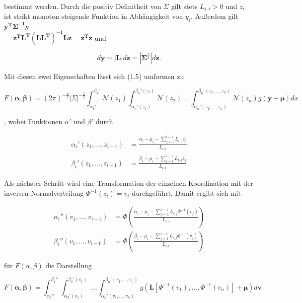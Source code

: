 \documentclass[12pt,a4paper]{scrartcl}
\numberwithin{equation}{section}
\begin{document}
bestimmt werden. Durch die positiv Definitheit von $\Sigma$ gilt stets $L_{i,i} > 0$ und $z_i$ ist strikt monoton steigende Funktion in Abhängigkeit von $y_i$.
Außerdem gilt $\mathbf{y^T\Sigma^{-1}y}$ \\ $ \mathbf{= z^TL^T(LL^T)^{-1}Lz} = \mathbf{z^Tz} $ und 

\begin{equation}
 d\mathbf{y} = |\mathbf{L}|d \mathbf{z} = |\mathbf{\Sigma}^{\frac{1}{2}}| d \mathbf{z}.
\end{equation}

Mit diesen zwei Eigenschaften lässt sich (1.5) umformen zu 

\begin{equation}
  F(\mathbf{\alpha},\mathbf{\beta}) = (2\pi)^{-\frac{n}{2}} |\Sigma|^{-\frac{1}{2}} \int_{\alpha_1'}^{\beta_1'} \mathcal{N}(z_1) \int_{\alpha_n'(z_1)}^{\beta_n'(z_1)} \mathcal{N}(z_2) \text{ ...} \int_{\alpha_n'(z_1,...,z_n)}^{\beta_n'(z_1,...,z_n)} \mathcal{N}(z_n) g(\mathbf{y} + \mathbf{\mu}) dx
\end{equation}

, wobei Funktionen $\alpha'$ und $\beta'$ durch 

\begin{equation}
  \begin{split}
    \alpha_i'(z_1,...,z_{i-1})  &=  \frac{\alpha_i - \mu_i - \sum_{j=1}^{i-1} L_{i,j}z_j}{L_{i,i}} \\
    \beta_i'(z_1,...,z_{i-1})   &=  \frac{\beta_i - \mu_i - \sum_{j=1}^{i-1} L_{i,j}z_j}{L_{i,i}} 
  \end{split}
\end{equation}

Als nächster Schritt wird eine Transformation der einzelnen Koordination mit der inversen Normalverteilung $\Phi^{-1}(z_i) = v_i$ durchgeführt. Damit ergibt sich mit

\begin{equation}
\begin{split}
 \alpha_i''(v_1,...,v_{i-1})&=  \Phi (\frac{\alpha_i - \mu_i - \sum_{j=1}^{i-1} L_{i,j}\Phi^{-1}(v_j)}{L_{i,i}} )\\
 \beta_i''(v_1,...,v_{i-1})&=  \Phi(\frac{\beta_i - \mu_i - \sum_{j=1}^{i-1} L_{i,j}\Phi^{-1}(v_j)}{L_{i,i}} )
 \end{split}
\end{equation}

für $F(\alpha,\beta)$ die Darstellung

\begin{equation}
  F(\mathbf{\alpha},\mathbf{\beta}) = \int_{\alpha_1''}^{\beta_1''} \int_{\alpha_2'(v_1)}^{\beta_2'(v_1)} \text{ ...} \int_{\alpha_n'(v_1,...,v_n)}^{\beta_n'(v_1,...,v_n)} g(\mathbf{L}[\Phi^{-1}(v_1),...,\Phi^{-1}(v_n)] + \mathbf{\mu}) d\mathbf{v}
\end{equation}
\end{document}
